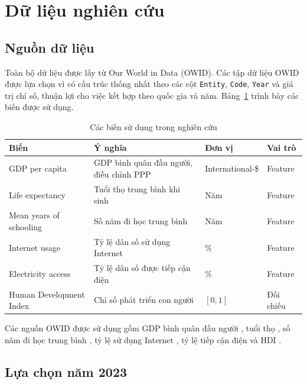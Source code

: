 \documentclass[11pt,a4paper]{article}
\begin{document}
\section{Dữ liệu nghiên cứu}

\subsection{Nguồn dữ liệu}

Toàn bộ dữ liệu được lấy từ Our World in Data (OWID). Các tập dữ liệu OWID được lựa chọn vì có cấu trúc thống nhất theo các cột \texttt{Entity}, \texttt{Code}, \texttt{Year} và giá trị chỉ số, thuận lợi cho việc kết hợp theo quốc gia và năm. Bảng~\ref{tab:variables} trình bày các biến được sử dụng.

\begin{table}[H]
\centering
\caption{Các biến sử dụng trong nghiên cứu}
\label{tab:variables}
\small
\begin{tabular}{p{3.2cm}p{5.0cm}p{2.8cm}p{2.0cm}}
\toprule
\textbf{Biến} & \textbf{Ý nghĩa} & \textbf{Đơn vị} & \textbf{Vai trò} \\
\midrule
GDP per capita & GDP bình quân đầu người, điều chỉnh PPP & International-\$ & Feature \\
Life expectancy & Tuổi thọ trung bình khi sinh & Năm & Feature \\
Mean years of schooling & Số năm đi học trung bình & Năm & Feature \\
Internet usage & Tỷ lệ dân số sử dụng Internet & \% & Feature \\
Electricity access & Tỷ lệ dân số được tiếp cận điện & \% & Feature \\
Human Development Index & Chỉ số phát triển con người & $[0,1]$ & Đối chiếu \\
\bottomrule
\end{tabular}
\end{table}

Các nguồn OWID được sử dụng gồm GDP bình quân đầu người \cite{owid_gdp}, tuổi thọ \cite{owid_life}, số năm đi học trung bình \cite{owid_schooling}, tỷ lệ sử dụng Internet \cite{owid_internet}, tỷ lệ tiếp cận điện \cite{owid_electricity} và HDI \cite{owid_hdi}.

\subsection{Lựa chọn năm 2023}
\end{document}
